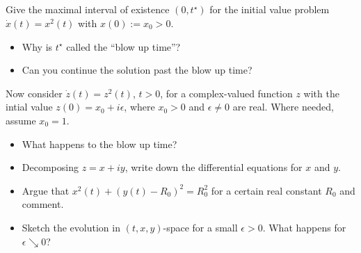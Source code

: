\documentclass[12pt,a4paper]{article}
\begin{document}
    
    \subsection{}
    
    Give the maximal interval of existence $(0, t^\star)$
    for the initial value problem
    $\dot{x}(t) = x^2(t)$
    with
    $x(0) := x_0 > 0$.
    
    \begin{itemize}
    \item 
        Why is $t^\star$ called the ``blow up time''?
    \item
        Can you continue the solution past the blow up time?
    \end{itemize}

    
    Now consider 
    $\dot{z}(t) = z^2(t)$, $t > 0$,
    for a complex-valued function $z$
    with the intial value
    $z(0) = x_0 + i \epsilon$,
    where $x_0 > 0$ and $\epsilon \neq 0$ are real.
    Where needed, assume $x_0 = 1$.

    \begin{itemize}
    \item 
        What happens to the blow up time?
    \item
        Decomposing $z = x + i y$,
        write down the differential equations for $x$ and $y$.
    \item
        Argue that $x^2(t) + (y(t) - R_0)^2 = R_0^2$
        for a certain real constant $R_0$
        and
        comment.
    \item
        Sketch the evolution in $(t, x, y)$-space 
        for a small $\epsilon > 0$.
        What happens for $\epsilon \searrow 0$?
    \end{itemize}

    
    
    \subsection{}
    
\end{document}
